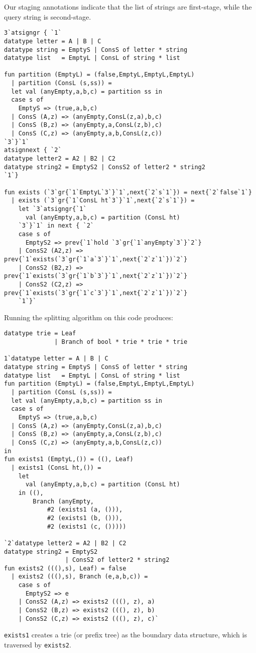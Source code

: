 Our staging annotations indicate that the list of strings are first-stage, while
the query string is second-stage.
\begin{lstlisting} 
3`atsigngr { `1`
datatype letter = A | B | C 
datatype string = EmptyS | ConsS of letter * string
datatype list   = EmptyL | ConsL of string * list

fun partition (EmptyL) = (false,EmptyL,EmptyL,EmptyL) 
  | partition (ConsL (s,ss)) = 
  let val (anyEmpty,a,b,c) = partition ss in 
  case s of 
    EmptyS => (true,a,b,c) 
  | ConsS (A,z) => (anyEmpty,ConsL(z,a),b,c) 
  | ConsS (B,z) => (anyEmpty,a,ConsL(z,b),c) 
  | ConsS (C,z) => (anyEmpty,a,b,ConsL(z,c)) 
`3`}`1`
atsignnext { `2`
datatype letter2 = A2 | B2 | C2
datatype string2 = EmptyS2 | ConsS2 of letter2 * string2
`1`}

fun exists (`3`gr{`1`EmptyL`3`}`1`,next{`2`s`1`}) = next{`2`false`1`} 
  | exists (`3`gr{`1`ConsL ht`3`}`1`,next{`2`s`1`}) = 
	let `3`atsigngr{`1`
	  val (anyEmpty,a,b,c) = partition (ConsL ht)
	`3`}`1` in next { `2`
	case s of 
	  EmptyS2 => prev{`1`hold `3`gr{`1`anyEmpty`3`}`2`} 
	| ConsS2 (A2,z) => prev{`1`exists(`3`gr{`1`a`3`}`1`,next{`2`z`1`})`2`} 
	| ConsS2 (B2,z) => prev{`1`exists(`3`gr{`1`b`3`}`1`,next{`2`z`1`})`2`}
	| ConsS2 (C2,z) => prev{`1`exists(`3`gr{`1`c`3`}`1`,next{`2`z`1`})`2`}  
	`1`}` 
\end{lstlisting}
Running the splitting algorithm on this code produces:
\begin{lstlisting} 
datatype trie = Leaf 
			  | Branch of bool * trie * trie * trie

1`datatype letter = A | B | C 
datatype string = EmptyS | ConsS of letter * string
datatype list   = EmptyL | ConsL of string * list
fun partition (EmptyL) = (false,EmptyL,EmptyL,EmptyL) 
  | partition (ConsL (s,ss)) = 
  let val (anyEmpty,a,b,c) = partition ss in 
  case s of 
    EmptyS => (true,a,b,c) 
  | ConsS (A,z) => (anyEmpty,ConsL(z,a),b,c) 
  | ConsS (B,z) => (anyEmpty,a,ConsL(z,b),c) 
  | ConsS (C,z) => (anyEmpty,a,b,ConsL(z,c)) 
in
fun exists1 (EmptyL,()) = ((), Leaf)
  | exists1 (ConsL ht,()) =
	let 
	  val (anyEmpty,a,b,c) = partition (ConsL ht) 
	in ((), 
		Branch (anyEmpty, 
			#2 (exists1 (a, ())), 
			#2 (exists1 (b, ())), 
			#2 (exists1 (c, ()))))

`2`datatype letter2 = A2 | B2 | C2
datatype string2 = EmptyS2 
                 | ConsS2 of letter2 * string2
fun exists2 (((),s), Leaf) = false
  | exists2 (((),s), Branch (e,a,b,c)) = 
    case s of
	  EmptyS2 => e
	| ConsS2 (A,z) => exists2 (((), z), a)
	| ConsS2 (B,z) => exists2 (((), z), b)
	| ConsS2 (C,z) => exists2 (((), z), c)`

\end{lstlisting}

\texttt{exists1} creates a trie (or prefix tree) as the boundary data structure,
which is traversed by \texttt{exists2}.

